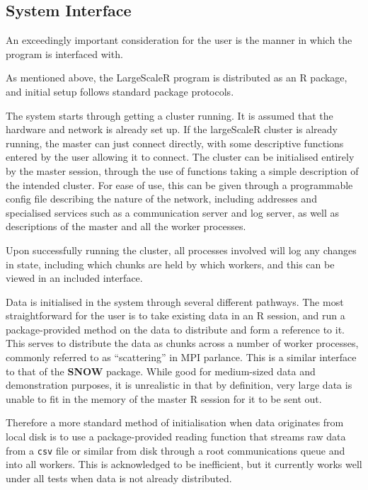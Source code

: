 \subsection{System Interface}

An exceedingly important consideration for the user is the manner in which the program is interfaced with.

As mentioned above, the LargeScaleR program is distributed as an R package, and initial setup follows standard package protocols.

The system starts through getting a cluster running.
It is assumed that the hardware and network is already set up.
If the largeScaleR cluster is already running, the master can just connect directly, with some descriptive functions entered by the user allowing it to connect.
The cluster can be initialised entirely by the master session, through the use of functions taking a simple description of the intended cluster.
For ease of use, this can be given through a programmable config file describing the nature of the network, including addresses and specialised services such as a communication server and log server, as well as descriptions of the master and all the worker processes.

Upon successfully running the cluster, all processes involved will log any changes in state, including which chunks are held by which workers, and this can be viewed in an included interface.

Data is initialised in the system through several different pathways.
The most straightforward for the user is to take existing data in an R session, and run a package-provided method on the data to distribute and form a reference to it.
This serves to distribute the data as chunks across a number of worker processes, commonly referred to as ``scattering'' in MPI parlance\cite{walker1996mpi}.
This is a similar interface to that of the \textbf{SNOW} package\cite{tierney18}.
While good for medium-sized data and demonstration purposes, it is unrealistic in that by definition, very large data is unable to fit in the memory of the master R session for it to be sent out.

Therefore a more standard method of initialisation when data originates from local disk is to use a package-provided reading function that streams raw data from a \texttt{csv} file or similar from disk through a root communications queue and into all workers.
This is acknowledged to be inefficient, but it currently works well under all tests when data is not already distributed.

